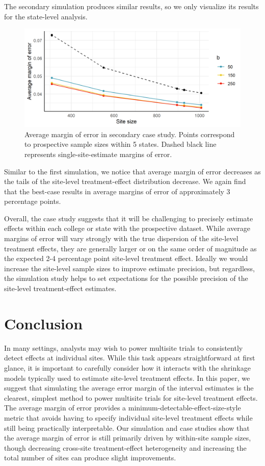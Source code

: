 \documentclass[]{article}
\begin{document}
The secondary simulation produces similar results, so we only visualize its results for the state-level analysis.
\begin{figure}[ht]
    \centering
    \includegraphics[width=\textwidth]{writeup/images/case_study2_states_moe.png}
    \caption{Average margin of error in secondary case study. Points correspond to prospective sample sizes within 5 states. Dashed black line represents single-site-estimate margins of error.}
    \label{fig:case_study_2_states_moe}
\end{figure}
Similar to the first simulation, we notice that average margin of error decreases as the tails of the site-level treatment-effect distribution decrease.
We again find that the best-case results in average margins of error of approximately 3 percentage points.

Overall, the case study suggests that it will be challenging to precisely estimate effects within each college or state with the prospective dataset.
While average margins of error will vary strongly with the true dispersion of the site-level treatment effects, they are generally larger or on the same order of magnitude as the expected 2-4 percentage point site-level treatment effect.
Ideally we would increase the site-level sample sizes to improve estimate precision, but regardless, the simulation study helps to set expectations for the possible precision of the site-level treatment-effect estimates.

\section{Conclusion}

In many settings, analysts may wish to power multisite trials to consistently detect effects at individual sites.
While this task appears straightforward at first glance, it is important to carefully consider how it interacts with the shrinkage models typically used to estimate site-level treatment effects.
In this paper, we suggest that simulating the average error margin of the interval estimates is the clearest, simplest method to power multisite trials for site-level treatment effects.
The average margin of error provides a minimum-detectable-effect-size-style metric that avoids having to specify individual site-level treatment effects while still being practically interpretable.
Our simulation and case studies show that the average margin of error is still primarily driven by within-site sample sizes, though decreasing cross-site treatment-effect heterogeneity and increasing the total number of sites can produce slight improvements.



	
\end{document}
